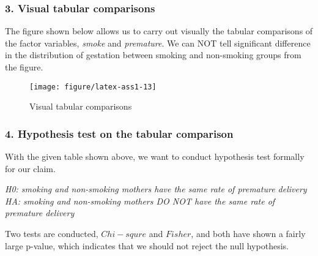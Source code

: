 \documentclass{article}\usepackage{graphicx, color}
\newenvironment{knitrout}{}{} %
\begin{document}
\subsubsection*{3. Visual tabular comparisons}
\hspace{12 pt} The figure shown below allows us to carry out visually the
tabular comparisons of the factor variables, \textit{smoke} and \textit{premature}.
We can NOT tell significant difference in the distribution of
gestation between smoking and non-smoking groups from the figure.
\begin{knitrout}
\color{fgcolor}\begin{figure}[]


{\centering \texttt{[image: figure/latex-ass1-13]} 

}

\caption[Visual tabular comparisons]{Visual tabular comparisons\label{fig:ass1-13}}
\end{figure}


\end{knitrout}


\subsubsection*{4. Hypothesis test on the tabular comparison}
\hspace{12 pt} With the given table shown above, we want to conduct
hypothesis test formally for our claim. \newline


\hspace{12 pt}\textit{H0: smoking and non-smoking mothers have the
  same rate of premature delivery} \newline
\vspace{2 pt} 
\hspace{24 pt}\textit{HA: smoking and non-smoking mothers DO NOT have the
  same rate of premature delivery} \newline


Two tests are conducted, $Chi-squre$ and $Fisher$, and both have shown a
fairly large p-value, which indicates that we should not reject the
null hypothesis.
\end{document}
